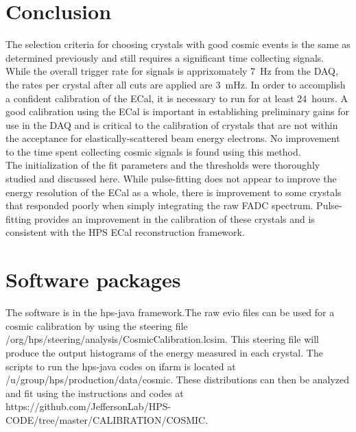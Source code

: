 \documentclass[twoside]{article}
\begin{document}
\section{Conclusion}
The selection criteria for choosing crystals with good cosmic events is the same as determined previously and still requires a significant time collecting signals. While the overall trigger rate for signals is apprixomately 7~Hz from the DAQ, the rates per crystal after all cuts are applied are 3~mHz. In order to accomplish a confident calibration of the ECal, it is necessary to run for at least 24~hours. A good calibration using the ECal is important in establishing preliminary gains for use in the DAQ and is critical to the calibration of crystals that are not within the acceptance for elastically-scattered beam energy electrons. No improvement to the time spent collecting cosmic signals is found using this method.\\
\indent The initialization of the fit parameters and the thresholds were thoroughly studied and discussed here. While pulse-fitting does not appear to improve the energy resolution of the ECal as a whole, there is improvement to some crystals that responded poorly when simply integrating the raw FADC spectrum. Pulse-fitting provides an improvement in the calibration of these crystals and is consistent with the HPS ECal reconstruction framework.\\

\section{Software packages}
The software is in the hps-java framework.The raw evio files can be used for a cosmic calibration by using the steering file /org/hps/steering/analysis/CosmicCalibration.lcsim. This steering file will produce the output histograms of the energy measured in each crystal. The scripts to run the hps-java codes on ifarm is located at /u/group/hps/production/data/cosmic. These distributions can then be analyzed and fit using the instructions and codes at https://github.com/JeffersonLab/HPS-CODE/tree/master/CALIBRATION/COSMIC.



{}



\end{document}
